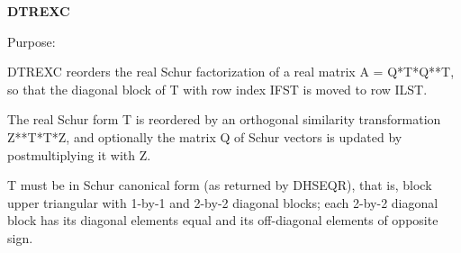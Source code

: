 {\bfseries D\+T\+R\+E\+X\+C} 

 \begin{DoxyParagraph}{Purpose\+: }
\begin{DoxyVerb} DTREXC reorders the real Schur factorization of a real matrix
 A = Q*T*Q**T, so that the diagonal block of T with row index IFST is
 moved to row ILST.

 The real Schur form T is reordered by an orthogonal similarity
 transformation Z**T*T*Z, and optionally the matrix Q of Schur vectors
 is updated by postmultiplying it with Z.

 T must be in Schur canonical form (as returned by DHSEQR), that is,
 block upper triangular with 1-by-1 and 2-by-2 diagonal blocks; each
 2-by-2 diagonal block has its diagonal elements equal and its
 off-diagonal elements of opposite sign.\end{DoxyVerb}
 
\end{DoxyParagraph}

